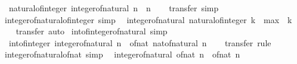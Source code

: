 \begin{isabellebody}
\ \ {\isachardoublequoteopen}natural{\isacharunderscore}{\kern0pt}of{\isacharunderscore}{\kern0pt}integer\ {\isacharparenleft}{\kern0pt}integer{\isacharunderscore}{\kern0pt}of{\isacharunderscore}{\kern0pt}natural\ n{\isacharparenright}{\kern0pt}\ {\isacharequal}{\kern0pt}\ n{\isachardoublequoteclose}\isanewline
%
\isadelimproof
\ \ %
\endisadelimproof
%
\isatagproof
{}\isamarkupfalse%
\ transfer\ simp%
\endisatagproof
{\isafoldproof}%
%
\isadelimproof
\isanewline
%
\endisadelimproof
\isanewline
{}\isamarkupfalse%
\ integer{\isacharunderscore}{\kern0pt}of{\isacharunderscore}{\kern0pt}natural{\isacharunderscore}{\kern0pt}of{\isacharunderscore}{\kern0pt}integer\ {\isacharbrackleft}{\kern0pt}simp{\isacharbrackright}{\kern0pt}{\isacharcolon}{\kern0pt}\isanewline
\ \ {\isachardoublequoteopen}integer{\isacharunderscore}{\kern0pt}of{\isacharunderscore}{\kern0pt}natural\ {\isacharparenleft}{\kern0pt}natural{\isacharunderscore}{\kern0pt}of{\isacharunderscore}{\kern0pt}integer\ k{\isacharparenright}{\kern0pt}\ {\isacharequal}{\kern0pt}\ max\ {}\ k{\isachardoublequoteclose}\isanewline
%
\isadelimproof
\ \ %
\endisadelimproof
%
\isatagproof
{}\isamarkupfalse%
\ transfer\ auto%
\endisatagproof
{\isafoldproof}%
%
\isadelimproof
\isanewline
%
\endisadelimproof
\isanewline
{}\isamarkupfalse%
\ int{\isacharunderscore}{\kern0pt}of{\isacharunderscore}{\kern0pt}integer{\isacharunderscore}{\kern0pt}of{\isacharunderscore}{\kern0pt}natural\ {\isacharbrackleft}{\kern0pt}simp{\isacharbrackright}{\kern0pt}{\isacharcolon}{\kern0pt}\isanewline
\ \ {\isachardoublequoteopen}int{\isacharunderscore}{\kern0pt}of{\isacharunderscore}{\kern0pt}integer\ {\isacharparenleft}{\kern0pt}integer{\isacharunderscore}{\kern0pt}of{\isacharunderscore}{\kern0pt}natural\ n{\isacharparenright}{\kern0pt}\ {\isacharequal}{\kern0pt}\ of{\isacharunderscore}{\kern0pt}nat\ {\isacharparenleft}{\kern0pt}nat{\isacharunderscore}{\kern0pt}of{\isacharunderscore}{\kern0pt}natural\ n{\isacharparenright}{\kern0pt}{\isachardoublequoteclose}\isanewline
%
\isadelimproof
\ \ %
\endisadelimproof
%
\isatagproof
{}\isamarkupfalse%
\ transfer\ rule%
\endisatagproof
{\isafoldproof}%
%
\isadelimproof
\isanewline
%
\endisadelimproof
\isanewline
{}\isamarkupfalse%
\ integer{\isacharunderscore}{\kern0pt}of{\isacharunderscore}{\kern0pt}natural{\isacharunderscore}{\kern0pt}of{\isacharunderscore}{\kern0pt}nat\ {\isacharbrackleft}{\kern0pt}simp{\isacharbrackright}{\kern0pt}{\isacharcolon}{\kern0pt}\isanewline
\ \ {\isachardoublequoteopen}integer{\isacharunderscore}{\kern0pt}of{\isacharunderscore}{\kern0pt}natural\ {\isacharparenleft}{\kern0pt}of{\isacharunderscore}{\kern0pt}nat\ n{\isacharparenright}{\kern0pt}\ {\isacharequal}{\kern0pt}\ of{\isacharunderscore}{\kern0pt}nat\ n{\isachardoublequoteclose}\isanewline

\end{isabellebody}
